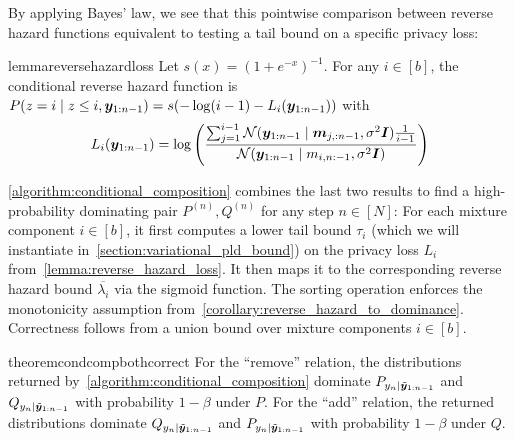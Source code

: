 \documentclass{article}
\theoremstyle{plain}
\theoremstyle{definition}
\theoremstyle{remark}
\begin{document}
By applying Bayes' law, we see that this pointwise comparison between reverse hazard functions equivalent to
testing a tail bound on a specific privacy loss:
\begin{restatable}{lemma}{reversehazardloss}\label{lemma:reverse_hazard_loss}
    Let $s(x) = (1 + e^{-x})^{-1}$. 
    For any $i \in [b]$,
    the conditional reverse hazard function is 
     $P(z =i \mid z \leq i, {\bm{y}}_{1:n-1}) = s(- \log(i-1) - L_i({\bm{y}}_{1:n-1}))$ with
    \begin{equation*}
        L_i({\bm{y}}_{1:n-1}) =
        \log\left(
        \frac{\sum_{j=1}^{i-1} \mathcal{N}({\bm{y}}_{1:n-1} \mid {\bm{m}}_{j,:n-1}, \sigma^2 {\bm{I}})  \frac{1}{i-1}}{\mathcal{N}({\bm{y}}_{1:n-1} \mid {m}_{i,n:-1}, \sigma^2 {\bm{I}})}
        \right)
    \end{equation*}
\end{restatable}
\cref{algorithm:conditional_composition} combines the last two results to find a high-probability dominating pair $P^{(n)},Q^{(n)}$ for any step $n \in [N]$: 
For each mixture component $i \in [b]$, it first computes a lower tail bound  $\tau_i$ (which we will instantiate in~\cref{section:variational_pld_bound})
on the privacy loss $L_i$ from~\cref{lemma:reverse_hazard_loss}. It then maps it to the corresponding reverse hazard bound $\overline{\lambda_i}$ via the sigmoid function.
The sorting operation enforces the monotonicity assumption from~\cref{corollary:reverse_hazard_to_dominance}.
Correctness follows from a union bound over mixture components $i \in [b]$.
\begin{restatable}{theorem}{condcompbothcorrect}
    For the ``remove'' relation, the distributions returned by~\cref{algorithm:conditional_composition} dominate $P_{{y}_n \mid \tilde{{\bm{y}}}_{1:n-1}}$ and $Q_{{y}_n \mid \tilde{{\bm{y}}}_{1:n-1}}$
    with probability $1 - \beta$ under $P$.
    For the ``add'' relation, the returned distributions dominate $Q_{{y}_n \mid \tilde{{\bm{y}}}_{1:n-1}}$ and $P_{{y}_n \mid \tilde{{\bm{y}}}_{1:n-1}}$
    with probability $1 - \beta$ under $Q$.
\end{restatable}
\end{document}
